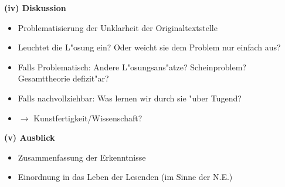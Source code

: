 \documentclass[a4paper]{article}
\begin{document}
\noindent \textbf{(iv) Diskussion} 

\begin{itemize}
  \item Problematisierung der Unklarheit der Originaltextstelle
  \item Leuchtet die L"osung ein? Oder weicht sie dem Problem nur einfach aus? 
  \item Falls Problematisch: Andere L"osungsans"atze? Scheinproblem? Gesamttheorie defizit"ar?
  \item Falls nachvollziehbar: Was lernen wir durch sie "uber Tugend? 
  \item $\rightarrow$ Kunstfertigkeit/Wissenschaft?
\end{itemize}


\noindent \textbf{(v) Ausblick} 

\begin{itemize}
  \item Zusammenfassung der Erkenntnisse
  \item Einordnung in das Leben der Lesenden (im Sinne der N.E.)
\end{itemize}
\end{document}
